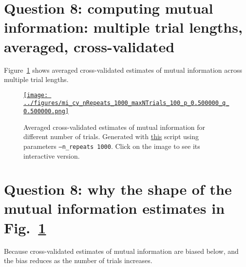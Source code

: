 \documentclass[12pt]{article}
\begin{document}
\section*{Question 8: computing mutual information: multiple trial lengths, averaged, cross-validated}

Figure~\ref{fig:miEstimatesCVMultiTrialAveraged} shows averaged cross-validated estimates of
mutual information across multiple trial lengths.

\begin{figure}[H]
    \begin{center}
        \href{https://www.gatsby.ucl.ac.uk/~rapela/neuroinformatics/2023/ws8/figures/mi_cv_nRepeats_1000_maxNTrials_100_p_0.500000_q_0.500000.html}{\texttt{[image: ../figures/mi\_cv\_nRepeats\_1000\_maxNTrials\_100\_p\_0.500000\_q\_0.500000.png]}}

        \caption{Averaged cross-validated estimates of mutual information for different number of trials.
        Generated with
        \href{https://github.com/joacorapela/neuroinformatics23/blob/master/worksheets/ws8/mySolution/code/scripts/doEstimateMI_cv_multiTrials.py}{this}
        script using parameters \texttt{--n\_repeats 1000}. Click on the image to see its
        interactive version.}

        \label{fig:miEstimatesCVMultiTrialAveraged}
    \end{center}
\end{figure}

\section*{Question 8: why the shape of the mutual information estimates in Fig.~\ref{fig:miEstimatesCVMultiTrialAveraged}}

Because cross-validated estimates of mutual information are biased below, and
the bias reduces as the number of trials increases.
\end{document}
